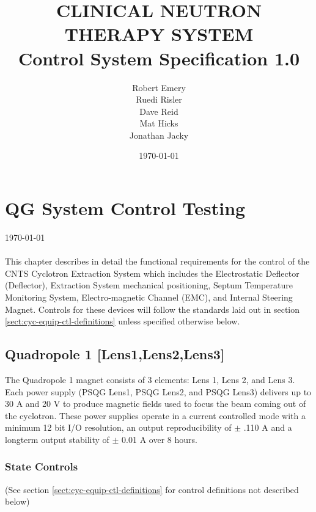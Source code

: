 \documentclass[11pt]{book}		%
\title{CLINICAL NEUTRON THERAPY SYSTEM\\
	Control System Specification 1.0\\[1.0cm]}
\author{Robert Emery\\
	Ruedi Risler\\
	Dave Reid \\
	Mat Hicks \\
        Jonathan Jacky}
\date{\today}
\begin{document}
\chapter{QG System Control Testing} \label{ch:cyc-equip-ctl-beamline}

\vspace*{-.75in}
\today \\
\vspace*{.75in}
\\

This chapter describes in detail the functional requirements for the control of the CNTS Cyclotron Extraction System which includes the Electrostatic Deflector (Deflector), Extraction System mechanical positioning, Septum Temperature Monitoring System, Electro-magnetic Channel (EMC), and Internal Steering Magnet.  Controls for these devices will follow the standards laid out in section \ref{sect:cyc-equip-ctl-definitions} unless specified otherwise below.

\section{Quadropole 1 [Lens1,Lens2,Lens3]} \label{sect:cyc-equip-ctl-beamline-quad1}

The Quadropole 1 magnet consists of 3 elements: Lens 1, Lens 2, and Lens 3. Each power supply (PSQG Lens1, PSQG Lens2, and PSQG Lens3) delivers up to 30 A and 20 V to produce magnetic fields used to focus the beam coming out of the cyclotron.  These power supplies operate in a current controlled mode with a minimum 12 bit I/O resolution, an output reproducibility of $\pm$ .110 A and a longterm output stability of $\pm$ 0.01 A over 8 hours.


\subsection{State Controls} \label{sect:cyc-equip-ctl-beamline-sm23a-state-controls}
(See section \ref{sect:cyc-equip-ctl-definitions} for control definitions not described below)
\end{document}

